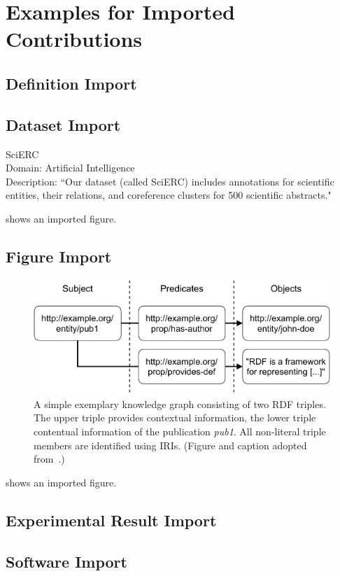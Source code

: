 
\section{Examples for Imported Contributions}

\subsection*{Definition Import}

\subsection*{Dataset Import}


\begin{dataset}
SciERC~\cite{DBLP:conf/emnlp/LuanHOH18}\\
Domain: Artificial Intelligence\\
Description: ``Our dataset (called SciERC) includes annotations for scientific entities, their relations, and coreference clusters for 500 scientific abstracts."~\cite{DBLP:conf/emnlp/LuanHOH18}
\label{dataset:scierc}
\end{dataset}

 shows an imported figure.

\subsection*{Figure Import}


\begin{figure}[htb!]
\centering
\includegraphics[max width=0.7\columnwidth]{./figures/triple_example}
\caption{A simple exemplary knowledge graph consisting of two RDF triples. The upper triple provides contextual information, the lower triple contentual information of the publication \emph{{pub1}}. All non-literal triple members are identified using IRIs. (Figure and caption adopted from~\cite{Martin21}.)}
\label{fig:contentual-contextual}
\end{figure}

 shows an imported figure.

\subsection*{Experimental Result Import}

\subsection*{Software Import}

